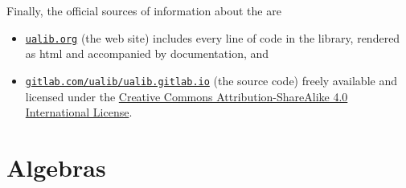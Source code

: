 \documentclass[a4paper,UKenglish,cleveref,autoref,thm-restate]{lipics-v2021}
\begin{document}
Finally, the official sources of information about the \agdaualib are
\begin{itemize}
  \item \href{https://ualib.gitlab.io}{\texttt{ualib.org}} (the web site) includes every line of code in the library, rendered as html and accompanied by documentation, and
  \item \href{https://gitlab.com/ualib/ualib.gitlab.io}{\texttt{gitlab.com/ualib/ualib.gitlab.io}} (the source code) freely available and licensed under the \href{https://creativecommons.org/licenses/by-sa/4.0/}{Creative Commons Attribution-ShareAlike 4.0 International License}.
\end{itemize}

















\section{Algebras}\label{sec:types-for-algebras}
\end{document}
